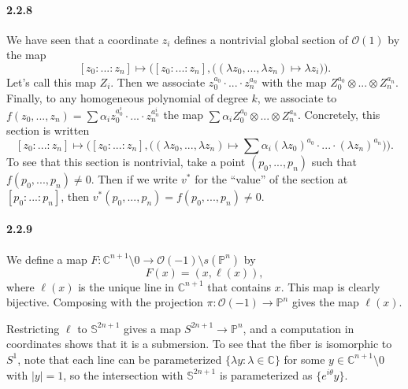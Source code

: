 \documentclass[10pt,letter]{article}
\begin{document}
\paragraph*{2.2.8}   We have seen that a coordinate $z_i$ defines a nontrivial global section of $\mathcal{O}(1)$ by the map
\[ [z_0:...:z_n] \mapsto \bigg( [z_0:...:z_n],\bigg( (\lambda z_0,...,\lambda z_n) \mapsto \lambda z_i \bigg) \bigg).\]
Let's call this map $Z_i$. Then we associate $z_0^{a_0} \cdot ... \cdot z_n^{a_n}$ with the map $Z_0^{a_0} \otimes ... \otimes Z_n^{a_n}$. Finally, to any homogeneous polynomial of degree $k$, we associate to $f(z_0,...,z_n) = \sum \alpha_i z_0^{a^i_0} \cdot ... \cdot z_n^{a^i_n}$ the map $\sum \alpha_i Z_0^{a_0} \otimes ... \otimes Z_n^{a_n}$. Concretely, this section is written 
\[ [z_0:...:z_n] \mapsto \bigg( [z_0:...:z_n], \bigg( ( \lambda z_0,...,\lambda z_n) \mapsto \sum \alpha_i (\lambda z_0)^{a_0} \cdot ... \cdot (\lambda z_n)^{a_n} \bigg) \bigg).\]
To see that this section is nontrivial, take a point $(p_0,...,p_n)$ such that $f(p_0,...,p_n) \neq 0$. Then if we write $v^{\ast}$ for the ``value'' of the section at $[p_0:...:p_n]$, then $v^{\ast}(p_0,...,p_n) = f(p_0,...,p_n) \neq 0$.

\paragraph*{2.2.9} We define a map $F: \mathbb{C}^{n+1} \setminus 0 \rightarrow  \mathcal{O}(-1) \setminus s(\mathbb{P}^n)$ by 
\[ F(x) = (x,\ell(x)), \]
where $\ell(x)$ is the unique line in $\mathbb{C}^{n+1}$ that contains $x$. This map is clearly bijective. Composing with the projection $\pi:  \mathcal{O}(-1) \rightarrow \mathbb{P}^n$ gives the map $\ell(x)$. 

Restricting $\ell$ to $\mathbb{S}^{2n+1}$ gives a map $S^{2n+1} \rightarrow \mathbb{P}^n$, and a computation in coordinates shows that it is a submersion. To see that the fiber is isomorphic to $S^1$, note that each line can be parameterized $\lbrace \lambda y: \lambda \in \mathbb{C} \rbrace$ for some $y \in \mathbb{C}^{n+1} \setminus 0$ with $\vert y \vert = 1$, so the intersection with $\mathbb{S}^{2n+1}$ is parameterized as $\lbrace e^{i\theta} y \rbrace$.
\end{document}
